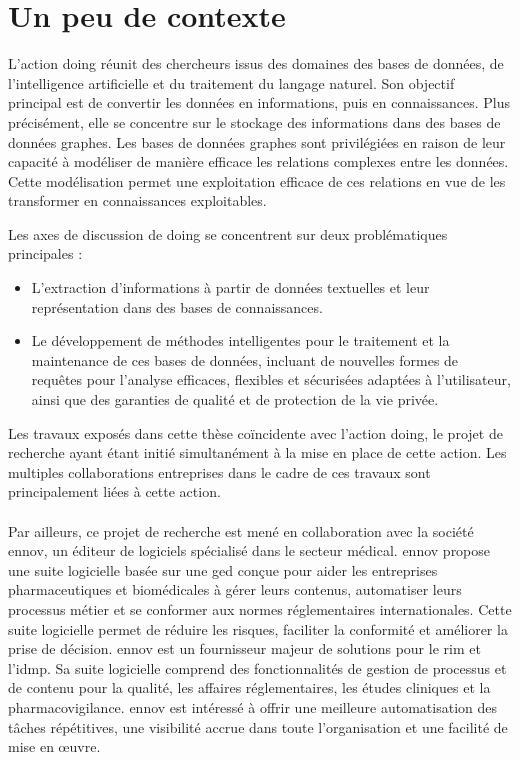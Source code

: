 \section{Un peu de contexte}

L'action \gls{doing} réunit des chercheurs issus des domaines des bases de données, de l'intelligence artificielle et du traitement du langage naturel.
Son objectif principal est de convertir les données en informations, puis en connaissances.
Plus précisément, elle se concentre sur le stockage des informations dans des bases de données graphes.
Les bases de données graphes sont privilégiées en raison de leur capacité à modéliser de manière efficace les relations complexes entre les données.
Cette modélisation permet une exploitation efficace de ces relations en vue de les transformer en connaissances exploitables.

Les axes de discussion de \gls{doing} se concentrent sur deux problématiques principales :
\begin{itemize}
    \item L'extraction d'informations à partir de données textuelles et leur représentation dans des bases de connaissances.
    \item Le développement de méthodes intelligentes pour le traitement et la maintenance de ces bases de données, incluant de nouvelles formes de requêtes pour l'analyse efficaces, flexibles et sécurisées adaptées à l'utilisateur, ainsi que des garanties de qualité et de protection de la vie privée.
\end{itemize}

Les travaux exposés dans cette thèse coïncidente avec l'action \gls{doing}, le projet de recherche ayant étant initié simultanément à la mise en place de cette action.
Les multiples collaborations entreprises dans le cadre de ces travaux sont principalement liées à cette action.

\paragraph{}
Par ailleurs, ce projet de recherche est mené en collaboration avec la société \gls{ennov}, un éditeur de logiciels spécialisé dans le secteur médical.
\gls{ennov} propose une suite logicielle basée sur une \gls{ged} conçue pour aider les entreprises pharmaceutiques et biomédicales à gérer leurs contenus, automatiser leurs processus métier et se conformer aux normes réglementaires internationales.
Cette suite logicielle permet de réduire les risques, faciliter la conformité et améliorer la prise de décision.
\gls{ennov} est un fournisseur majeur de solutions pour le \gls{rim} et l'\gls{idmp}.
Sa suite logicielle comprend des fonctionnalités de gestion de processus et de contenu pour la qualité, les affaires réglementaires, les études cliniques et la pharmacovigilance.
\gls{ennov} est intéressé à offrir une meilleure automatisation des tâches répétitives, une visibilité accrue dans toute l'organisation et une facilité de mise en œuvre.

